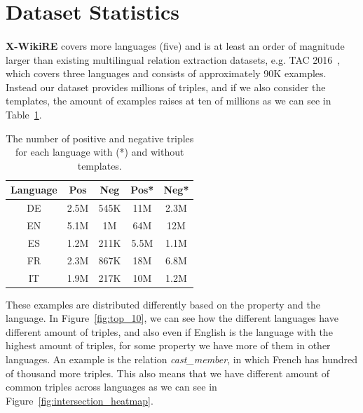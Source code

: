 \section{Dataset Statistics}
\label{sec:data_stats}
\paragraph{}
\textbf{X-WikiRE} covers  more  languages  (five)  and  is  at  least  an  order of magnitude larger than existing multilingual relation extraction datasets,  e.g.  TAC 2016~\citep{ellis2015overview}, which  covers  three  languages  and  consists  of approximately 90K examples. Instead our dataset provides millions of triples, and if we also consider the templates, the amount of examples raises at ten of millions as we can see in Table~\ref{table:datasetstats}.

\begin{table}[h!]
\fontsize{12}{12}\selectfont
\centering
\begin{tabular}{c | c c c c}
\toprule
Language & Pos  & Neg  & Pos*  & Neg* \\ \midrule
DE       & 2.5M & 545K & 11M  & 2.3M \\ %
EN       & 5.1M & 1M   & 64M  & 12M  \\ %
ES       & 1.2M & 211K & 5.5M & 1.1M \\ %
FR       & 2.3M & 867K & 18M  & 6.8M \\ %
IT       & 1.9M & 217K & 10M  & 1.2M \\ %
\bottomrule
\end{tabular}
\caption{The number of positive and negative triples for each language with (*) and without templates.}
\label{table:datasetstats}
\end{table}

These examples are distributed differently based on the property and the language. In Figure~\ref{fig:top_10}, we can see how the different languages have different amount of triples, and also even if English is the language with the highest amount of triples, for some property we have more of them in other languages. An example is the relation \textit{cast\_member}, in which French has hundred of thousand more triples. This also means that we have different amount of common triples across languages as we can see in Figure~\ref{fig:intersection_heatmap}. 



